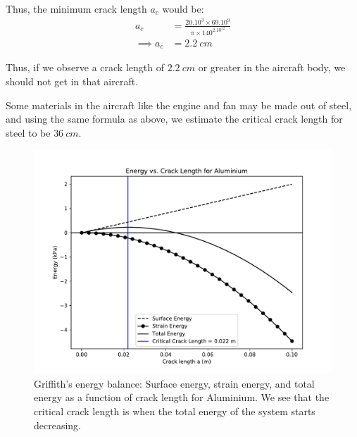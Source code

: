 \documentclass[11pt]{article}
\begin{document}
Thus, the minimum crack length $a_c$ would be:
\begin{align}
    a_c &= \frac{20.10^{3} \times 69.10^9}{\pi \times 140^2.10^{12}} \\
    \implies a_c &= 2.2\ cm
\end{align}

Thus, if we observe a crack length of $2.2\ cm$ or greater in the aircraft body, we should not get in that aircraft.

Some materials in the aircraft like the engine and fan may be made out of steel, and using the same formula as above, we estimate the critical crack length for steel to be $36\ cm$.

\begin{figure}[!htb]
    \centering
    \includegraphics[scale=0.6]{fig1.pdf}
    \caption{Griffith's energy balance: Surface energy, strain energy, and total energy as a function of crack length for Aluminium. We see that the critical crack length is when the total energy of the system starts decreasing.}
\end{figure}

\end{document}
